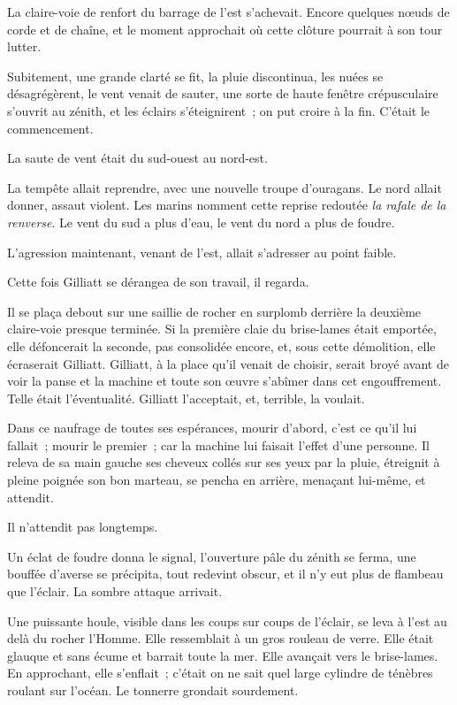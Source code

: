 \documentclass[french,twoside]{book} %
\begin{document}
La claire-voie de renfort du barrage de l’est s’achevait. Encore quelques nœuds de corde et de chaîne, et le moment approchait où cette clôture pourrait à son tour lutter.\par
Subitement, une grande clarté se fit, la pluie discontinua, les nuées se désagrégèrent, le vent venait de sauter, une sorte de haute fenêtre crépusculaire s’ouvrit au zénith, et les éclairs s’éteignirent ; on put croire à la fin. C’était le commencement.\par
La saute de vent était du sud-ouest au nord-est.\par
La tempête allait reprendre, avec une nouvelle troupe d’ouragans. Le nord allait donner, assaut violent. Les marins nomment cette reprise redoutée \emph{la rafale de la renverse}. Le vent du sud a plus d’eau, le vent du nord a plus de foudre.\par
L’agression maintenant, venant de l’est, allait s’adresser au point faible.\par
Cette fois Gilliatt se dérangea de son travail, il regarda.\par
Il se plaça debout sur une saillie de rocher en surplomb derrière la deuxième claire-voie presque  terminée. Si la première claie du brise-lames était emportée, elle défoncerait la seconde, pas consolidée encore, et, sous cette démolition, elle écraserait Gilliatt. Gilliatt, à la place qu’il venait de choisir, serait broyé avant de voir la panse et la machine et toute son œuvre s’abîmer dans cet engouffrement. Telle était l’éventualité. Gilliatt l’acceptait, et, terrible, la voulait.\par
Dans ce naufrage de toutes ses espérances, mourir d’abord, c’est ce qu’il lui fallait ; mourir le premier ; car la machine lui faisait l’effet d’une personne. Il releva de sa main gauche ses cheveux collés sur ses yeux par la pluie, étreignit à pleine poignée son bon marteau, se pencha en arrière, menaçant lui-même, et attendit.\par
Il n’attendit pas longtemps.\par
Un éclat de foudre donna le signal, l’ouverture pâle du zénith se ferma, une bouffée d’averse se précipita, tout redevint obscur, et il n’y eut plus de flambeau que l’éclair. La sombre attaque arrivait.\par
Une puissante houle, visible dans les coups sur coups de l’éclair, se leva à l’est au delà du rocher l’Homme. Elle ressemblait à un gros rouleau de verre. Elle était glauque et sans écume et barrait toute la mer. Elle avançait vers le brise-lames. En approchant, elle s’enflait ; c’était on ne sait quel large cylindre de ténèbres roulant sur l’océan. Le tonnerre grondait sourdement.\par
\end{document}
